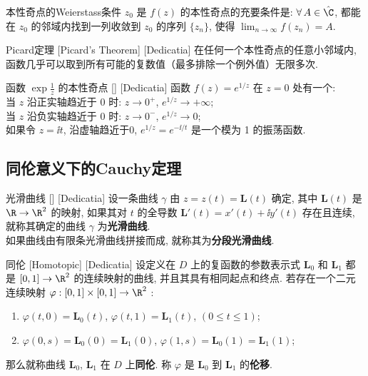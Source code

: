 \documentclass[UTF8]{ctexart}
\begin{document}
        \begin{thm}
            {本性奇点的Weierstass条件}
            \(z_0\) 是 \(f(z)\) 的本性奇点的充要条件是:  \(\forall\,A\in\hat{\C}\), 都能在 \(z_0\) 的邻域内找到一列收敛到 \(z_0\) 的序列 \(\{z_n\}\), 使得 \(\lim_{n\to\infty}f(z_n)=A\).
        \end{thm}

        \begin{thm}
            [UUID]
            {Picard定理}
            [Picard's Theorem]
            [Dedicatia]
            在任何一个本性奇点的任意小邻域内, 函数几乎可以取到所有可能的复数值（最多排除一个例外值）无限多次. 
        \end{thm}

        \begin{xmp}
            [UUID]
            {函数 \(\exp\frac{1}{z}\) 的本性奇点}
            []
            [Dedicatia]
            函数 \(f(z) = e^{1/z}\) 在 \(z=0\) 处有一个\EssentialSingularity :\\
            当 \(z\) 沿正实轴趋近于 0 时: \(z \to 0^+\), \(e^{1/z} \to +\infty\);\\ 
            当 \(z\) 沿负实轴趋近于 0 时: \(z \to 0^-\), \(e^{1/z} \to 0\);\\
            如果令 \(z =\ii t\), 沿虚轴趋近于0, \(e^{1/z} = e^{-\ii/t}\) 是一个模为 1 的振荡函数.
        \end{xmp}

    \subsection{同伦意义下的Cauchy定理}

        \begin{dfn}
            [UUID]
            {光滑曲线}
            []
            [Dedicatia]
            设一条曲线 \(\gamma\) 由 \(z=z(t)=\bm{L}(t)\) 确定, 其中 \(\bm{L}(t)\) 是 \(\R\to\R^2\) 的映射, 如果其对 \(t\) 的全导数 \(\bm{L}'(t)=x'(t)+\ii y'(t)\) 存在且连续, 就称其确定的曲线 \(\gamma\) 为\textbf{光滑曲线}. \\
            如果曲线由有限条光滑曲线拼接而成, 就称其为\textbf{分段光滑曲线}. 
        \end{dfn}

        \begin{dfn}
            [UUID]
            {同伦}
            [Homotopic]
            [Dedicatia]
            设定义在 \(D\) 上的复函数的参数表示式 \(\bm{L}_0\) 和 \(\bm{L}_1\) 都是 \([0,1]\to\R^2\) 的连续映射的曲线, 并且其具有相同起点和终点. 若存在一个二元连续映射 \(\varphi:[0,1]\times[0,1]\to\R^2\) :
            \begin{enumerate}
                \item  \(\varphi(t,0)=\bm{L}_0(t)\),  \(\varphi(t,1)=\bm{L}_1(t)\),  \((0\leq t\leq 1)\);
                \item  \(\varphi(0,s)=\bm{L}_0(0)=\bm{L}_1(0)\),  \(\varphi(1,s)=\bm{L}_0(1)=\bm{L}_1(1)\);
            \end{enumerate}
            那么就称曲线 \(\bm{L}_0\),  \(\bm{L}_1\) 在 \(D\) 上\textbf{同伦}. 称 \(\varphi\) 是 \(\bm{L}_0\) 到 \(\bm{L}_1\) 的\textbf{伦移}. 
        \end{dfn}
\end{document}
